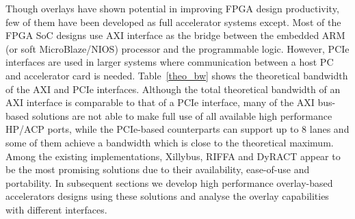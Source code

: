 Though overlays have shown potential in improving FPGA design productivity, few of them have been developed as full accelerator systems except. 
Most of the FPGA SoC designs use AXI interface as the bridge between the embedded ARM (or soft MicroBlaze/NIOS) processor and the programmable logic. 
However, PCIe interfaces are used in larger systems where communication between a host PC and accelerator card is needed. 
Table~\ref{theo_bw} shows the theoretical bandwidth of the AXI and PCIe interfaces. 
Although the total theoretical bandwidth of an AXI interface is comparable to that of a PCIe interface, many of the AXI bus-based solutions are not able to make full use of all available high performance HP/ACP ports, while the PCIe-based counterparts can support up to 8 lanes and some of them achieve a bandwidth which is close to the theoretical maximum. 
Among the existing implementations, Xillybus, RIFFA and DyRACT appear to be the most promising solutions due to their availability, ease-of-use and portability. 
In subsequent sections we develop high performance overlay-based accelerators designs using these solutions and analyse the overlay capabilities with different interfaces.


\begin{table}
	\caption{Theoretical bandwidth of typical memory interfaces.}
	\label{theo_bw}
	\centering
\end{table}

